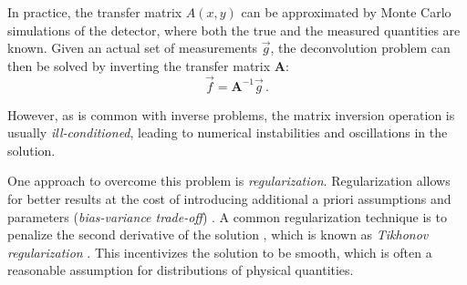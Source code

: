 In practice,
the transfer matrix $A(x, y)$ can be approximated
by Monte Carlo simulations of the detector,
  where both the true and the measured quantities are known.
Given an actual set of measurements $\vec{g}$,
the deconvolution problem can then be solved
by inverting the transfer matrix $\symbf{A}$:
\begin{equation}
  \label{eq:deconvolution_problem:discretized:inverse}
  \vec{f} = \symbf{A}^{-1} \vec{g} \, .
\end{equation}

However,
as is common with inverse problems,
the matrix inversion operation is usually \emph{ill-conditioned},
  leading to numerical instabilities
  and oscillations in the solution.


 \label{sec:dsea:deconvolution_problem:regularization}
One approach to overcome this problem
is \emph{regularization}.
Regularization allows for better results
  at the cost of introducing additional a priori assumptions and parameters
    (\emph{bias-variance trade-off}) \cite{bias_variance_tradeoff}. %
A common regularization technique is
  to penalize the second derivative of the solution \cite{deconvolution_starck},
    which is known as \emph{Tikhonov regularization} \cite{tikhonov_regularization}.
This incentivizes the solution to be smooth,
  which is often a reasonable assumption for distributions of physical quantities.

